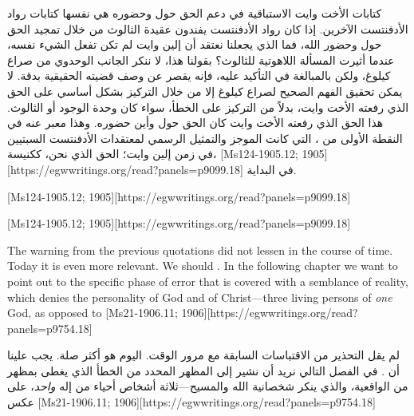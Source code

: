 كتابات الأخت وايت الاستباقية في دعم الحق حول  وحضوره هي نفسها كتابات رواد الأدفنتست الآخرين. إذا كان رواد الأدفنتست يفندون عقيدة الثالوث من خلال تمجيد الحق حول  وحضور الله، فما الذي يجعلنا نعتقد أن إلين وايت لم تكن تفعل الشيء نفسه، عندما أثيرت المسألة اللاهوتية للثالوث؟ بقولنا هذا، لا ننكر الجانب الوحدوي من صراع كيلوغ، ولكن بالمبالغة في التأكيد عليه، فإنه يقصر عن وصف قضيته الحقيقية بدقة. لا يمكن تحقيق الفهم الصحيح لصراع كيلوغ إلا من خلال التركيز بشكل أساسي على الحق الذي رفعته الأخت وايت، بدلاً من التركيز على الخطأ، سواء كان وحدة الوجود أو الثالوث. هذا الحق الذي رفعته الأخت وايت كان الحق حول  وأين حضوره. وهذا معبر عنه في النقطة الأولى من ، التي كانت الموجز والتمثيل الرسمي لمعتقدات الأدفنتست السبتيين في زمن إلين وايت؛ الحق الذي نحن، ككنيسة، [Ms124-1905.12; 1905][https://egwwritings.org/read?panels=p9099.18] في البداية.


[Ms124-1905.12; 1905][https://egwwritings.org/read?panels=p9099.18]


[Ms124-1905.12; 1905][https://egwwritings.org/read?panels=p9099.18]


The warning from the previous quotations did not lessen in the course of time. Today it is even more relevant. We should . In the following chapter we want to point out to the specific phase of error that is covered with a semblance of reality, which denies the personality of God and of Christ—three living persons of \textit{one} God, as opposed to [Ms21-1906.11; 1906][https://egwwritings.org/read?panels=p9754.18]


لم يقل التحذير من الاقتباسات السابقة مع مرور الوقت. اليوم هو أكثر صلة. يجب علينا أن . في الفصل التالي نريد أن نشير إلى المظهر المحدد من الخطأ الذي يغطى بمظهر من الواقعية، والذي ينكر شخصانية الله والمسيح—ثلاثة أشخاص أحياء من إله \textit{واحد}، على عكس [Ms21-1906.11; 1906][https://egwwritings.org/read?panels=p9754.18]


